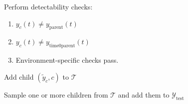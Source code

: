 \begin{algorithm}[t]
\begin{algorithmic}[1]
            \State Perform detectability checks:
            \begin{enumerate}
                \item $y_c(t) \neq y_{\mathrm{parent}}(t)$
                \item $y_c(t) \neq y_{\mathrm{time0parent}}(t)$
                \item Environment-specific checks pass.
            \end{enumerate}
                \State Add child $(\tilde{y}_c, c)$ to $\mathcal{T}$
            \EndIf
        \EndIf

    \EndFor
    \State Sample one or more children from $\mathcal{T}$ and add them to $\mathcal{Y}_{\mathrm{test}}$
\EndWhile

\end{algorithmic}
\end{algorithm}
